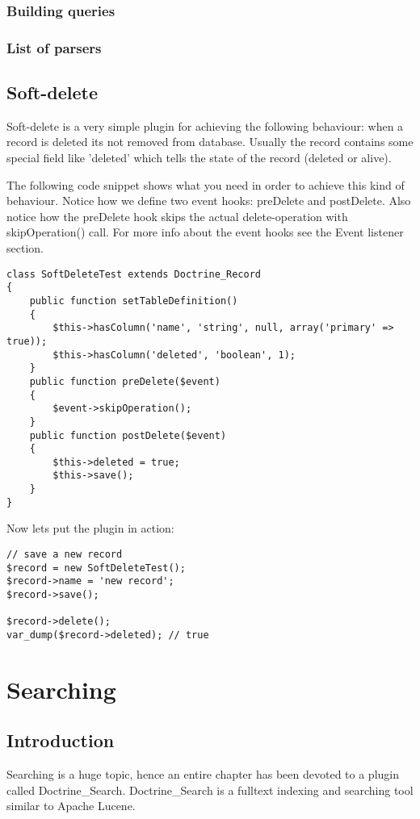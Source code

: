 \documentclass[11pt,a4paper]{report}
\begin{document}
\subsection{Building queries}
\subsection{List of parsers}
\section{Soft-delete}
Soft-delete is a very simple plugin for achieving the following behaviour: when a record is deleted its not removed from database. Usually the record contains some special field like 'deleted' which tells the state of the record (deleted or alive).

The following code snippet shows what you need in order to achieve this kind of behaviour. Notice how we define two event hooks: preDelete and postDelete. Also notice how the preDelete hook skips the actual delete-operation with skipOperation() call. For more info about the event hooks see the Event listener section.

\begin{verbatim}
class SoftDeleteTest extends Doctrine_Record
{
    public function setTableDefinition()
    {
        $this->hasColumn('name', 'string', null, array('primary' => true));
        $this->hasColumn('deleted', 'boolean', 1);
    }
    public function preDelete($event)
    {
        $event->skipOperation();
    }
    public function postDelete($event)
    {
        $this->deleted = true;
        $this->save();
    }
}
\end{verbatim}

Now lets put the plugin in action:

\begin{verbatim}
// save a new record
$record = new SoftDeleteTest();
$record->name = 'new record';
$record->save();

$record->delete();
var_dump($record->deleted); // true
\end{verbatim}

\chapter{Searching}
\section{Introduction}
Searching is a huge topic, hence an entire chapter has been devoted to a plugin called Doctrine\_Search. Doctrine\_Search is a fulltext indexing and searching tool similar to Apache Lucene.
\end{document}

